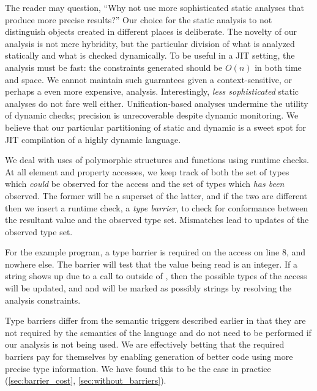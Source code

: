 The reader may question, ``Why not use more sophisticated static analyses that
produce more precise results?''
Our choice for the static analysis to not distinguish  objects
created in different places is deliberate. The novelty of our analysis is not
mere hybridity, but the particular division of what is analyzed statically and
what is checked dynamically. To be useful in a JIT setting, the analysis must
be fast: the constraints generated should be $O(n)$ in both time and space. We
cannot maintain such guarantees given a context-sensitive, or perhaps a even
more expensive, analysis. Interestingly, \emph{less sophisticated} static
analyses do not fare well either. Unification-based analyses undermine the
utility of dynamic checks; precision is unrecoverable despite dynamic
monitoring. We believe that our particular partitioning of static and dynamic
is a sweet spot for JIT compilation of a highly dynamic language.

We deal with uses of polymorphic structures and functions using runtime checks.
At all element and property accesses, we keep track of both the set of
types which \emph{could} be observed for the access and the set of types
which \emph{has been} observed.
The former will be a superset of the latter, and if the two are different then
we insert a runtime check, a {\it type barrier}, to check for conformance
between the resultant value and the observed type set.
Mismatches lead to updates of the observed type set.

For the example program, a type barrier is required on the  access
on line 8, and nowhere else. The barrier will test that the value being read
is an integer. If a string shows up due to a call to 
outside of , then the possible types of the  access
will be updated, and  and  will be marked as possibly
strings by resolving the analysis constraints.

Type barriers differ from the semantic triggers described earlier in that
they are not required by the semantics of the language and do not need to
be performed if our analysis is not being used.
We are effectively betting that the required barriers
pay for themselves by enabling generation of better code using more precise type information.
We have found this to be the case in practice (\Section\ref{sec:barrier_cost}, \Section\ref{sec:without_barriers}).

